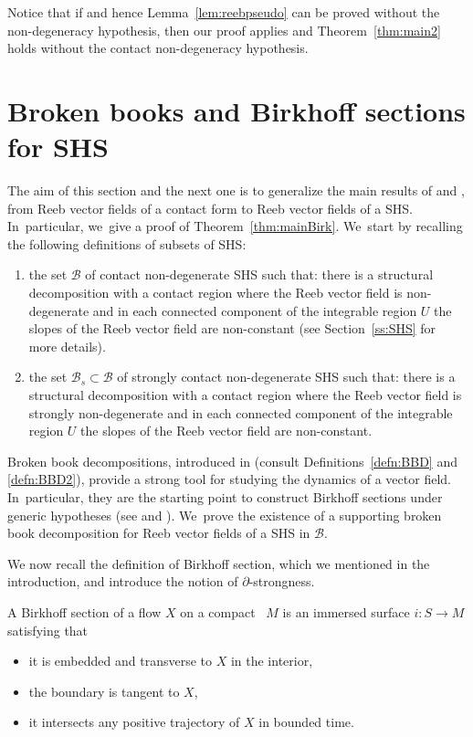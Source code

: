\begin{Remark}\label{rem:degeneratecase}
Notice that if \cite[Th.\,1.2]{CDR} and hence Lemma~\ref{lem:reebpseudo} can be proved without the non-degeneracy hypothesis, then our proof applies and Theorem~\ref{thm:main2} holds without the contact non-degeneracy hypothesis.
\end{Remark}

\section{Broken books and Birkhoff sections for SHS}\label{s:SHSsections}

The aim of this section and the next one is to generalize the main results of \cite{CDR} and \cite{CDHR, CM}, from Reeb vector fields of a contact form to Reeb vector fields of a SHS. In~particular, we~give a proof of Theorem~\ref{thm:mainBirk}. We~start by recalling the following definitions of subsets of SHS:
\begin{enumerate}
\item the set $\mathcal{B}$ of contact non-degenerate SHS such that: there is a structural decomposition with a contact region where the Reeb vector field is non-degenerate and in each connected component of the integrable region $U$ the slopes of the Reeb vector field are non-constant (see Section~\ref{ss:SHS} for more details).
\item the set $\mathcal{B}_s\subset \mathcal{B}$ of strongly contact non-degenerate SHS such that: there is a structural decomposition with a contact region where the Reeb vector field is strongly non-degenerate and in each connected component of the integrable region $U$ the slopes of the Reeb vector field are non-constant.
\end{enumerate}

Broken book decompositions, introduced in \cite{CDR} (consult Definitions~\ref{defn:BBD} and \ref{defn:BBD2}), provide a strong tool for studying the dynamics of a vector field. In~particular, they are the starting point to construct Birkhoff sections under generic hypotheses (see \cite{CDHR} and \cite{CM}). We~prove the existence of a supporting broken book decomposition for Reeb vector fields of a SHS in $\mathcal{B}$.

We now recall the definition of Birkhoff section, which we mentioned in the introduction, and introduce the notion of $\partial$-strongness.

\begin{defi}
A Birkhoff section of a flow $X$ on a compact \threemanifold~$M$ is an immersed surface $i:S \to M$ satisfying that
\begin{itemize}
\item
it is embedded and transverse to $X$ in the interior,
\item
the boundary is tangent to $X$,
\item
it intersects any positive trajectory of $X$ in bounded time.
\end{itemize}
\end{defi}

